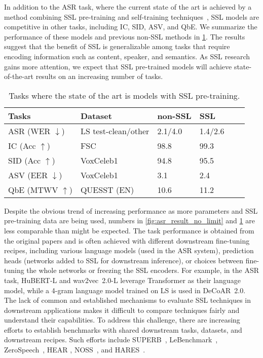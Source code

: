 In addition to the ASR task, where the current state of the art is achieved by a method
combining SSL pre-training and self-training 
techniques~\cite{zhang_pushing_2020}, SSL models are competitive in other tasks, including IC,
SID, ASV, and QbE. We summarize the performance of these models and previous
non-SSL methods in \cref{table:sota_performance}. The results suggest that the
benefit of SSL is generalizable among tasks that require encoding 
information such as content, speaker, and semantics. As SSL research
gains more attention, we expect that SSL pre-trained models will 
achieve state-of-the-art results on an increasing number of tasks.

\begin{table}[ht]
  \centering
  \footnotesize
  \caption{Tasks where the state of the art is models with SSL pre-training.}
  \label{table:sota_performance}
  \renewcommand*\arraystretch{1.2}
  \begin{tabular}{llllll}  
    \toprule
    Tasks & Dataset & non-SSL & SSL \\
    \midrule
    ASR (WER $\downarrow$) & LS test-clean/other & 2.1/4.0 \cite{xu_iterative_2020} & 1.4/2.6 \cite{zhang_pushing_2020} \\ \hline
    IC (Acc $\uparrow$) & FSC & 98.8 \cite{lugosch_speech_2019} & 99.3\cite{chen_unispeechsat_2021} \\ \hline
    SID (Acc $\uparrow$) & VoxCeleb1 & 94.8 \cite{hajibabaei_unified_2018} & 95.5 \cite{chen_wavlm_2021} \\ \hline
    ASV (EER $\downarrow$) & VoxCeleb1 & 3.1 \cite{hajavi_siamese_2021} & 2.4 \cite{wang_finetuned_2021} \\ \hline
    QbE (MTWV $\uparrow$) & QUESST (EN) & 10.6 \cite{rodriguez-fuentes_gttsehu_2014} & 11.2\cite{chen_unispeechsat_2021} \\
    \bottomrule
  \end{tabular}
\end{table}

Despite the obvious trend of increasing performance as more parameters and SSL
pre-training data are being used, numbers in \cref{fig:asr_result_no_limit} 
and \cref{table:sota_performance} are less comparable than might be expected.
The task performance is obtained from the original papers and is often
achieved with different downstream fine-tuning recipes, including various
language models (used in the ASR system), prediction heads (networks added to
SSL for downstream inference), or choices between fine-tuning the whole
networks or freezing the SSL encoders. For example, in the ASR task, HuBERT-L
and wav2vec~2.0-L leverage Transformer as their language model, while a 4-gram
language model trained on LS is used in DeCoAR~2.0. The lack of common and
established mechanisms to evaluate SSL techniques in downstream applications
makes it difficult to compare techniques fairly and understand their
capabilities. To address this challenge, there are increasing efforts to establish
benchmarks with shared downstream tasks, datasets, and downstream recipes. Such
efforts include SUPERB~\cite{yang_superb_2021}, 
LeBenchmark~\cite{evain_lebenchmark_2021}, ZeroSpeech~\cite{dunbar_zero_2020},
HEAR \cite{turian_hear_2022},
NOSS~\cite{shor_learning_2020}, and HARES~\cite{wang_learning_2021}. 

